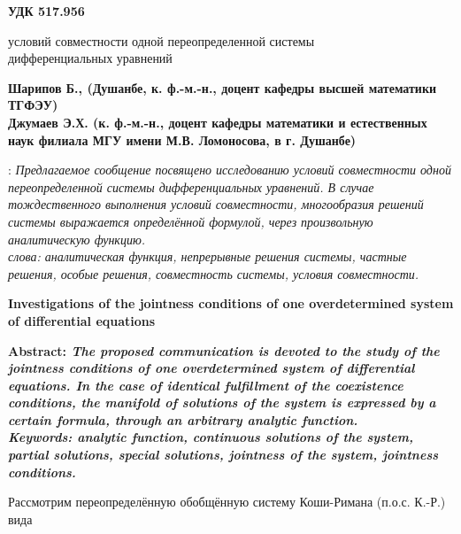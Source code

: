 \documentclass[11pt, a4paper]{article}
\begin{document}
	\Large	
	\bf УДК 517.956\\
	\begin{center}
		 условий совместности одной переопределенной системы\\
		дифференциальных уравнений\\
	\end{center}
	
	\noindent\bf Шарипов Б., (Душанбе, к. ф.-м.-н., доцент кафедры высшей математики ТГФЭУ)\\
	\bf{Джумаев Э.Х. (к. ф.-м.-н., доцент кафедры математики и естественных наук филиала МГУ имени М.В. Ломоносова, в г. Душанбе)}\\
	
	\vspace{0.5cm}
	
	: \it Предлагаемое сообщение посвящено исследованию условий совместности одной переопределенной системы дифференциальных уравнений. В случае тождественного выполнения условий совместности, многообразия решений системы выражается определённой формулой, через произвольную аналитическую функцию.\\
	
	 слова: \it аналитическая функция, непрерывные решения системы, частные решения, особые решения, совместность системы, условия совместности.\\
	
	\begin{center}
		\textbf{Investigations of the jointness conditions of one overdetermined system of differential equations}\\
	\end{center}
	
	\bf Abstract: \it The proposed communication is devoted to the study of the jointness conditions of one overdetermined system of differential equations. In the case of identical fulfillment of the coexistence conditions, the manifold of solutions of the system is expressed by a certain formula, through an arbitrary analytic function.\\
	
	\bf Keywords: \it analytic function, continuous solutions of the system, partial solutions, special solutions, jointness of the system, jointness conditions.\\
	
	\vspace{0.5cm}
	
	\rm Рассмотрим переопределённую обобщённую систему Коши-Римана (п.о.с. К.-Р.) вида
	
\end{document}
